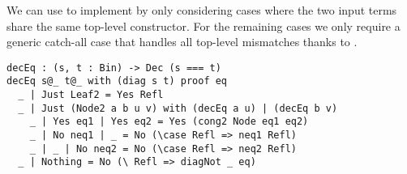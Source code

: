 \noindent
We can use  to implement 
by only considering cases where the two input terms share the same
top-level constructor.
For the remaining cases we only require a generic catch-all case that handles all top-level mismatches thanks to .

\begin{verbatim}
decEq : (s, t : Bin) -> Dec (s === t)
decEq s@_ t@_ with (diag s t) proof eq
  _ | Just Leaf2 = Yes Refl
  _ | Just (Node2 a b u v) with (decEq a u) | (decEq b v)
    _ | Yes eq1 | Yes eq2 = Yes (cong2 Node eq1 eq2)
    _ | No neq1 | _ = No (\case Refl => neq1 Refl)
    _ | _ | No neq2 = No (\case Refl => neq2 Refl)
  _ | Nothing = No (\ Refl => diagNot _ eq)
\end{verbatim}


